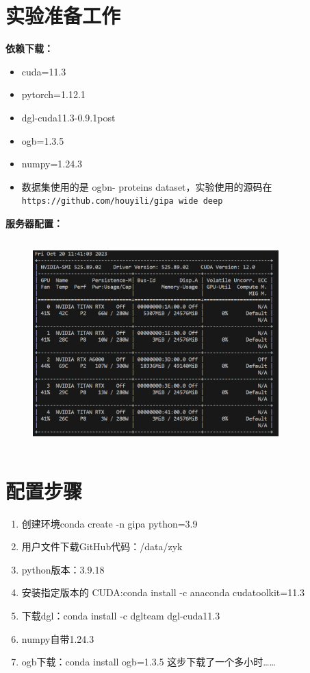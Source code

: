 \documentclass{article}
\begin{document}
\section*{实验准备工作}
\textbf{依赖下载：}
\begin{itemize}
\item cuda=11.3
\item pytorch=1.12.1
\item dgl-cuda11.3-0.9.1post
\item ogb=1.3.5
\item numpy=1.24.3
\item 数据集使用的是 ogbn- proteins dataset，实验使用的源码在\verb|https://github.com/houyili/gipa wide deep|
\end{itemize}
\textbf{服务器配置：}
\begin{figure}[htbp]
    \centering
    \includegraphics[width=9.5cm,height=8cm]{服务器配置.png}
\end{figure}
\section*{配置步骤}
\begin{enumerate}
\item 创建环境conda create -n gipa python=3.9
\item 用户文件下载GitHub代码：/data/zyk
\item python版本：3.9.18
\item 安装指定版本的 CUDA:conda install -c anaconda cudatoolkit=11.3
\item 下载dgl：conda install -c dglteam dgl-cuda11.3
\item numpy自带1.24.3
\item ogb下载：conda install ogb=1.3.5  这步下载了一个多小时……
\end{enumerate}
\end{document}
